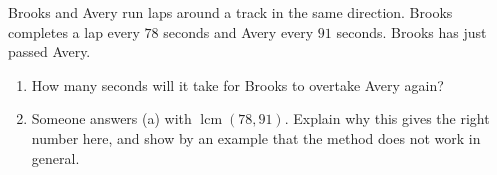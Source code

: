 Brooks and Avery run laps around a track in the same direction. Brooks completes a lap every $78$ seconds and Avery every $91$ seconds. Brooks has just passed Avery.
\begin{enumerate}
\item[(a)] How many seconds will it take for Brooks to overtake Avery again?
\item[(b)] Someone answers (a) with $\operatorname{lcm}(78,91)$. Explain why this gives the right number here, and show by an example that the method does not work in general.
\end{enumerate}
